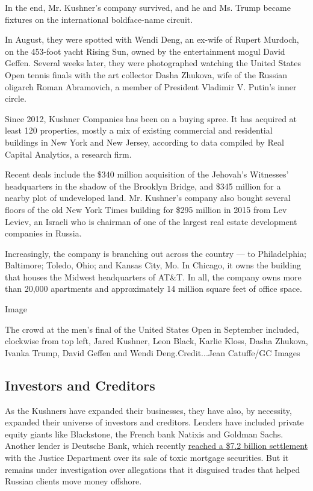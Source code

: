 In the end, Mr. Kushner's company survived, and he and Ms. Trump became
fixtures on the international boldface-name circuit.

In August, they were spotted with Wendi Deng, an ex-wife of Rupert
Murdoch, on the 453-foot yacht Rising Sun, owned by the entertainment
mogul David Geffen. Several weeks later, they were photographed watching
the United States Open tennis finals with the art collector Dasha
Zhukova, wife of the Russian oligarch Roman Abramovich, a member of
President Vladimir V. Putin's inner circle.

Since 2012, Kushner Companies has been on a buying spree. It has
acquired at least 120 properties, mostly a mix of existing commercial
and residential buildings in New York and New Jersey, according to data
compiled by Real Capital Analytics, a research firm.

Recent deals include the \$340 million acquisition of the Jehovah's
Witnesses' headquarters in the shadow of the Brooklyn Bridge, and \$345
million for a nearby plot of undeveloped land. Mr. Kushner's company
also bought several floors of the old New York Times building for \$295
million in 2015 from Lev Leviev, an Israeli who is chairman of one of
the largest real estate development companies in Russia.

Increasingly, the company is branching out across the country --- to
Philadelphia; Baltimore; Toledo, Ohio; and Kansas City, Mo. In Chicago,
it owns the building that houses the Midwest headquarters of AT\&T. In
all, the company owns more than 20,000 apartments and approximately 14
million square feet of office space.

Image

The crowd at the men's final of the United States Open in September
included, clockwise from top left, Jared Kushner, Leon Black, Karlie
Kloss, Dasha Zhukova, Ivanka Trump, David Geffen and Wendi
Deng.Credit...Jean Catuffe/GC Images

\hypertarget{investors-and-creditors}{%
\subsection{Investors and Creditors}\label{investors-and-creditors}}

As the Kushners have expanded their businesses, they have also, by
necessity, expanded their universe of investors and creditors. Lenders
have included private equity giants like Blackstone, the French bank
Natixis and Goldman Sachs. Another lender is Deutsche Bank, which
recently
\href{https://www.nytimes.com/2016/12/22/business/dealbook/deutsche-bank-mortgage-securities-justice-department-homeowners.html}{reached
a \$7.2 billion settlement} with the Justice Department over its sale of
toxic mortgage securities. But it remains under investigation over
allegations that it disguised trades that helped Russian clients move
money offshore.

